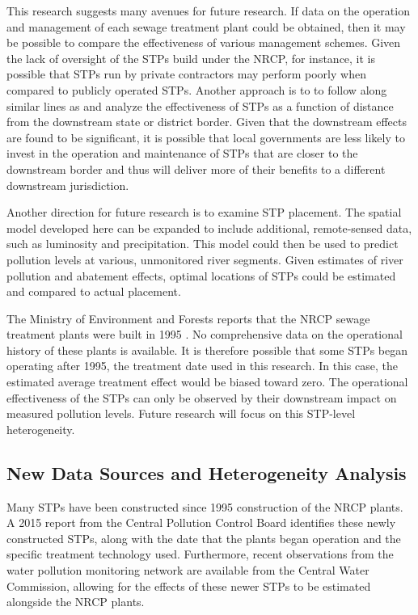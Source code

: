 \documentclass[12pt]{article}
\renewcommand{\citet}[1]{\citeauthor{#1} \citeyearpar{#1}}
\begin{document}
This research suggests many avenues for future research. If data on the operation and management of each sewage treatment plant could be obtained, then it may be possible to compare the effectiveness of various management schemes. Given the lack of oversight of the STPs build under the NRCP, for instance, it is possible that STPs run by private contractors may perform poorly when compared to publicly operated STPs. Another approach is to to follow along similar lines as \citet{lipscomb2015} and analyze the effectiveness of STPs as a function of distance from the downstream state or district border. Given that the downstream effects are found to be significant, it is possible that local governments are less likely to invest in the operation and maintenance of STPs that are closer to the downstream border and thus will deliver more of their benefits to a different downstream jurisdiction. 

Another direction for future research is to examine STP placement. The spatial model developed here can be expanded to include additional, remote-sensed data, such as luminosity and precipitation. This model could then be used to predict pollution levels at various, unmonitored river segments. Given estimates of river pollution and abatement effects, optimal locations of STPs could be estimated and compared to actual placement. 

The Ministry of Environment and Forests reports that the NRCP sewage treatment plants were built in 1995 \citep{nrcd2013}. No comprehensive data on the operational history of these plants is available. It is therefore possible that some STPs began operating after 1995, the treatment date used in this research. In this case, the estimated average treatment effect would be biased toward zero. The operational effectiveness of the STPs can only be observed by their downstream impact on measured pollution levels. Future research will focus on this STP-level heterogeneity. 

\subsection{New Data Sources and Heterogeneity Analysis}

Many STPs have been constructed since 1995 construction of the NRCP plants. A 2015 report from the Central Pollution Control Board identifies these newly constructed STPs, along with the date that the plants began operation and the specific treatment technology used. Furthermore, recent observations from the water pollution monitoring network are available from the Central Water Commission, allowing for the effects of these newer STPs to be estimated alongside the NRCP plants. 
\end{document}

